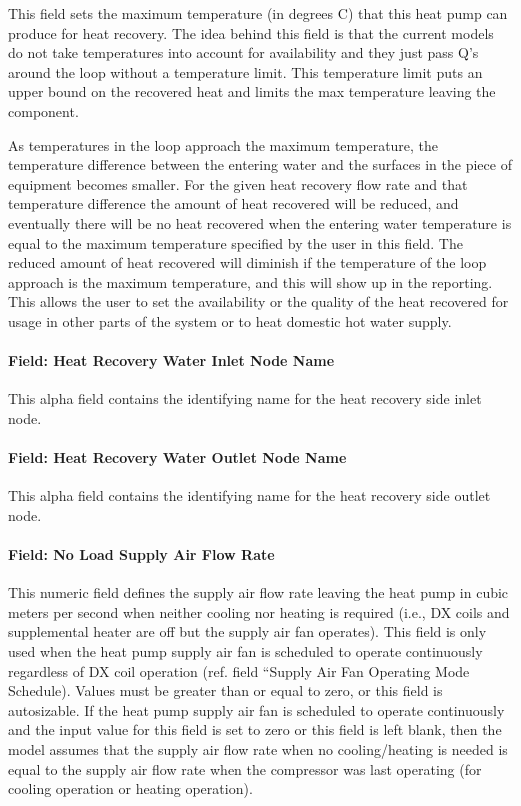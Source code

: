 This field sets the maximum temperature (in degrees C) that this heat pump can produce for heat recovery. The idea behind this field is that the current models do not take temperatures into account for availability and they just pass Q's around the loop without a temperature limit. This temperature limit puts an upper bound on the recovered heat and limits the max temperature leaving the component.

As temperatures in the loop approach the maximum temperature, the temperature difference between the entering water and the surfaces in the piece of equipment becomes smaller. For the given heat recovery flow rate and that temperature difference the amount of heat recovered will be reduced, and eventually there will be no heat recovered when the entering water temperature is equal to the maximum temperature specified by the user in this field. The reduced amount of heat recovered will diminish if the temperature of the loop approach is the maximum temperature, and this will show up in the reporting. This allows the user to set the availability or the quality of the heat recovered for usage in other parts of the system or to heat domestic hot water supply.

\paragraph{Field: Heat Recovery Water Inlet Node Name}\label{field-heat-recovery-water-inlet-node-name-1-000}

This alpha field contains the identifying name for the heat recovery side inlet node.

\paragraph{Field: Heat Recovery Water Outlet Node Name}\label{field-heat-recovery-water-outlet-node-name-1-000}

This alpha field contains the identifying name for the heat recovery side outlet node.

\paragraph{Field: No Load Supply Air Flow Rate}\label{field-no-load-supply-air-flow-rate-4-000}

This numeric field defines the supply air flow rate leaving the heat pump in cubic meters per second when neither cooling nor heating is required (i.e., DX coils and supplemental heater are off but the supply air fan operates). This field is only used when the heat pump supply air fan is scheduled to operate continuously regardless of DX coil operation (ref. field ``Supply Air Fan Operating Mode Schedule). Values must be greater than or equal to zero, or this field is autosizable. If the heat pump supply air fan is scheduled to operate continuously and the input value for this field is set to zero or this field is left blank, then the model assumes that the supply air flow rate when no cooling/heating is needed is equal to the supply air flow rate when the compressor was last operating (for cooling operation or heating operation).

